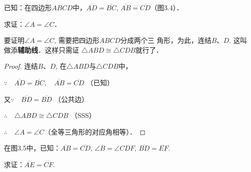 \begin{figure}[htp]\centering
    \begin{minipage}[t]{0.48\textwidth}
    \centering
{}
    \caption{}
    \end{minipage}
    \begin{minipage}[t]{0.48\textwidth}
    \centering
    \caption{}
    \end{minipage}
    \end{figure}


\begin{example}
    已知：在四边形$ABCD$中，$\overline{AD}=\overline{BC}$,
$\overline{AB}=\overline{CD}$（图3.4）．

求证：$\angle A=\angle C$．
\end{example}

\begin{analyze}
    要证明$\angle A=\angle C$, 
需要把四边形$ABCD$分成两个三
角形，为此，连结$B$、$D$. 这叫
做添\textbf{辅助线}．这样只需证
$\triangle ABD\cong \triangle CDB$就行了．
\end{analyze}

\begin{proof}
连结$B$、$D$, 在$\triangle ABD$与$\triangle CDB$中，

$\because\quad \overline{AD}=\overline{BC},\quad \overline{AB}=\overline{CD}$ （已知）

又$\because\quad \overline{BD}=\overline{BD}$ （公共边）

$\therefore\quad \triangle ABD\cong \triangle CDB$ （SSS）

$\therefore\quad \angle A=\angle C$（全等三角形的对应角相等）．
\end{proof}    

\begin{example}
在图3.5中，已知：$\overline{AB}=\overline{CD}$, $\angle B=\angle CDF$, $\overline{BD}=\overline{EF}$.

求证：$\overline{AE}=\overline{CF}$.
\end{example}

